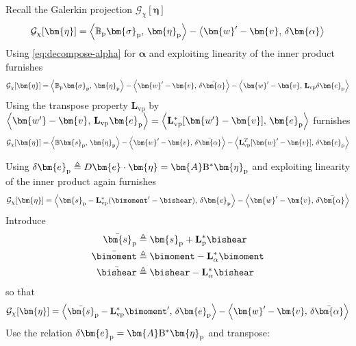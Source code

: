 Recall the Galerkin projection \(\mathcal{G}_{\chi}[\bm{\eta}]\)
\begin{equation*}
\mathcal{G}_{\chi}[\bm{\eta}] = \left< \mathbb{B}_{\rm p} \bm{\sigma}_{\rm p} ,\, \bm{\eta}_{\rm p} \right>
-\left< \bm{w}'-\bm{v},\, \delta\bm{\alpha} \right>
\end{equation*}
Using \eqref{eq:decompose-alpha} for \(\bm{\alpha}\) and exploiting linearity of the inner product furnishes
\begin{equation*}
\mathcal{G}_{\chi}[\bm{\eta}]
= \left< \mathbb{B}_{\rm p} \bm{\sigma}_{\rm{p}} ,\, \bm{\eta}_{\rm p} \right>
-\left< \bm{w}'-\bm{v} ,\, \delta \bar{\bm{\alpha}} \right>
-\left< \bm{w}'-\bm{v} ,\, \mathbf{L}_{\mathrm{vp}} \delta \bm{e}_{\rm p} \right>
\end{equation*}
Using the transpose property \(\mathbf{L}_{\mathrm{vp}}\) by \(\left<\bm{w'} - \bm{v},\,\mathbf{L}_{\rm v p} \bm{e}_{\rm p}\right> = \left<\mathbf{L}_{\rm vp}^*[\bm{w'} - \bm{v}],\, \bm{e}_{\rm p}\right>\) furnishes
\begin{equation*}
\mathcal{G}_{\chi}[\bm{\eta}] = \left< \mathbb{B} \bm{s}_{\rm p} ,\, \bm{\eta}_{\rm p} \right>
-\left< \bm{w}'-\bm{v} ,\, \delta \bar{\bm{\alpha}} \right>
-\left< \mathbf{L}_{\mathrm{vp}}^T [\bm{w}'-\bm{v}] ,\, \delta \bm{e}_{\rm p} \right>
\end{equation*}

%
Using %
\(\delta \bm{e}_{\rm p}\triangleq D\bm{e}\cdot \bm{\eta}= \bm{A}\mathrm{B}^*\bm{\eta}_{\rm p}\) 
and exploiting linearity of the inner product again furnishes
\begin{equation*}
\mathcal{G}_{\chi}[\bm{\eta}] = 
\left<\bm{s}_{\rm p}  - \mathbf{L}_{\mathrm{vp}}^* (\bimoment' -\bishear),\, \delta \bm{e}_{\rm p} \right>
-\left< \bm{w}'-\bm{v} ,\, \delta \bar{\bm{\alpha}} \right>
\end{equation*}
Introduce
\begin{equation}
\begin{aligned}
\bar{\bm{s}}_{\rm p} &\triangleq \bm{s}_{\rm p} + \mathbf{L}_{\rm p}^*\bishear \\
\bar{\bimoment} &\triangleq \bimoment - \mathbf{L}_{\alpha}^* \bimoment \\
\bar{\bishear} &\triangleq \bishear - \mathbf{L}_{\alpha}^* \bishear 
\end{aligned}
\end{equation}
so that
\begin{equation*}
\mathcal{G}_{\chi}[\bm{\eta}] = 
\left< \bar{\bm{s}}_{\rm p} - \mathbf{L}_{\rm vp}^* \bimoment' ,\, \delta \bm{e}_{\rm p} \right>
-\left< {\bm{w}}'-{\bm{v}} ,\, \delta \bar{\bm{\alpha}} \right>
\end{equation*}
Use the relation \(\delta \bm{e}_{\rm p} = \bm{A}\mathrm{B}^*\bm{\eta}_{\rm p}\)
and transpose:

